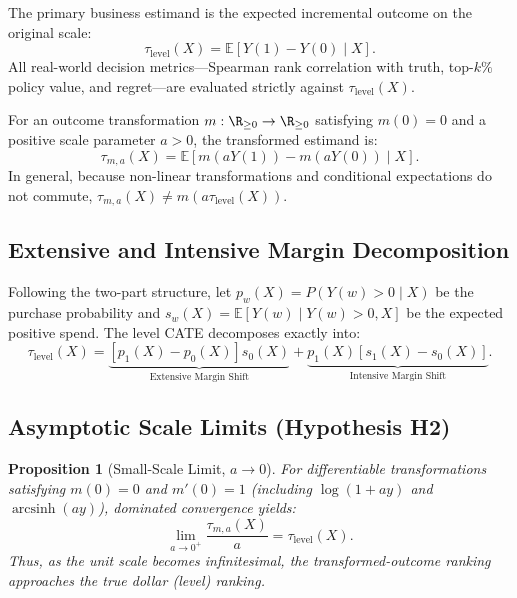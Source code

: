 \documentclass[conference]{IEEEtran}
\newcommand{\taulevel}{\tau_{\text{level}}}
\newcommand{\tauma}{\tau_{m, a}}
\newcommand{\E}{\mathbb{E}}
\newtheorem{proposition}{Proposition}
\begin{document}
\begin{definition}
The primary business estimand is the expected incremental outcome on the original scale:
\begin{equation}
\taulevel(X) = \E[Y(1) - Y(0) \mid X].
\end{equation}
All real-world decision metrics---Spearman rank correlation with truth, top-$k\%$ policy value, and regret---are evaluated strictly against $\taulevel(X)$.
\end{definition}

\begin{definition}
For an outcome transformation $m: \R_{\ge 0} \to \R_{\ge 0}$ satisfying $m(0)=0$ and a positive scale parameter $a > 0$, the transformed estimand is:
\begin{equation}
\tauma(X) = \E[m(aY(1)) - m(aY(0)) \mid X].
\end{equation}
In general, because non-linear transformations and conditional expectations do not commute, $\tauma(X) \neq m(a\taulevel(X))$.
\end{definition}

\subsection{Extensive and Intensive Margin Decomposition}
Following the two-part structure, let $p_w(X) = P(Y(w) > 0 \mid X)$ be the purchase probability and $s_w(X) = \E[Y(w) \mid Y(w) > 0, X]$ be the expected positive spend. The level CATE decomposes exactly into:
\begin{equation}
\boxed{\taulevel(X) = \underbrace{[p_1(X) - p_0(X)] s_0(X)}_{\text{Extensive Margin Shift}} + \underbrace{p_1(X) [s_1(X) - s_0(X)]}_{\text{Intensive Margin Shift}}.}
\end{equation}

\subsection{Asymptotic Scale Limits (Hypothesis H2)}
\begin{proposition}[Small-Scale Limit, $a \to 0$]
For differentiable transformations satisfying $m(0) = 0$ and $m'(0) = 1$ (including $\log(1+ay)$ and $\operatorname{arcsinh}(ay)$), dominated convergence yields:
\begin{equation}
\lim_{a \to 0^+} \frac{\tauma(X)}{a} = \taulevel(X).
\end{equation}
Thus, as the unit scale becomes infinitesimal, the transformed-outcome ranking approaches the true dollar (level) ranking.
\end{proposition}
\end{document}
